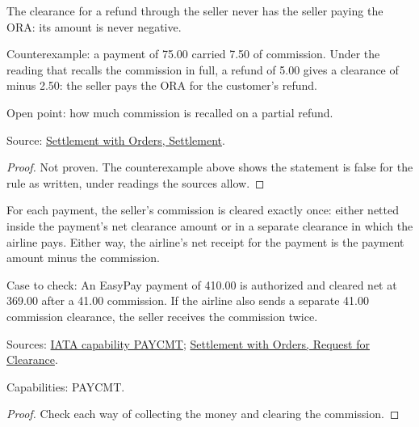 \begin{theorem}
  \label{thm:accounting-refund-not-paid-by-seller}
  The clearance for a refund through the seller never has the seller paying
  the ORA: its amount is never negative.

  Counterexample: a payment of 75.00 carried 7.50 of commission.  Under the
  reading that recalls the commission in full, a refund of 5.00 gives a
  clearance of minus 2.50: the seller pays the ORA for the customer's
  refund.

  Open point: how much commission is recalled on a partial refund.

  Source: \href{https://standards.atlassian.net/wiki/spaces/SWO/pages/574816478}{Settlement with Orders, Settlement}.
\end{theorem}
\begin{proof}
  Not proven.  The counterexample above shows the statement is false for
  the rule as written, under readings the sources allow.
\end{proof}

\begin{theorem}
  \label{thm:accounting-commission-cleared-once}
  For each payment, the seller's commission is cleared exactly once: either
  netted inside the payment's net clearance amount or in a separate
  clearance in which the airline pays. Either way, the airline's net receipt
  for the payment is the payment amount minus the commission.

  Case to check: An EasyPay payment of 410.00 is authorized and cleared net
  at 369.00 after a 41.00 commission. If the airline also sends a separate
  41.00 commission clearance, the seller receives the commission twice.

  Sources: \href{https://retailing.iata.org/armi/docs/PAYCMT/}{IATA capability PAYCMT};
  \href{https://standards.atlassian.net/wiki/spaces/SWO/pages/574259760}{Settlement with Orders, Request for Clearance}.

  Capabilities: PAYCMT.
\end{theorem}
\begin{proof}
  Check each way of collecting the money and clearing the commission.
\end{proof}

